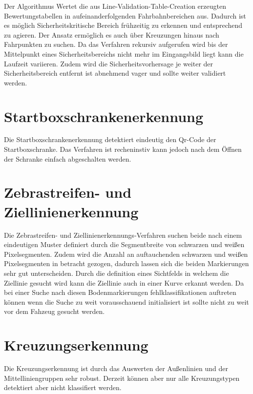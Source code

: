Der Algorithmus Wertet die aus Line-Validation-Table-Creation erzeugten Bewertungstabellen in aufeinanderfolgenden Fahrbahnbereichen aus. Dadurch ist es m{\"o}glich Sicherheitskritische Bereich fr{\"u}hzeitig zu erkennen und entsprechend zu agieren. Der Ansatz erm{\"o}glich es auch {\"u}ber Kreuzungen hinaus nach Fahrpunkten zu suchen. Da das Verfahren rekursiv aufgerufen wird bis der Mittelpunkt eines Sicherheitsbereichs nicht mehr im Eingangsbild liegt kann die Laufzeit variieren. Zudem wird die Sicherheitsvorhersage je weiter der Sicherheitsbereich entfernt ist abnehmend vager und sollte weiter validiert werden.

\section{Startboxschrankenerkennung}
\label{section:Startboxschrankenerkennung}
Die Startboxschrankenerkennung detektiert eindeutig den Qr-Code der Startboxschranke. Das Verfahren ist recheninstiv kann jedoch nach dem {\"O}ffnen der Schranke einfach abgeschalten werden.


\section{Zebrastreifen- und Ziellinienerkennung}
\label{section:Zebrastreifen- und Ziellinienerkennung}
Die Zebrastreifen- und Ziellinienerkennungs-Verfahren suchen beide nach einem eindeutigen Muster definiert durch die Segmentbreite von schwarzen und wei{\ss}en Pixelsegmenten. Zudem wird die Anzahl an auftauchenden schwarzen und wei{\ss}en Pixelsegmenten in betracht gezogen, dadurch lassen sich die beiden Markierungen sehr gut unterscheiden.
Durch die definition eines Sichtfelds in welchem die Ziellinie gesucht wird kann die Ziellinie auch in einer Kurve erkannt werden.
Da bei einer Suche nach diesen Bodenmarkierungen fehlklassifikationen auftreten k{\"o}nnen wenn die Suche zu weit vorausschauend initialisiert ist sollte nicht zu weit vor dem Fahzeug gesucht werden.  


\section{Kreuzungserkennung}
\label{section:Kreuzungserkennung}
Die Kreuzungserkennung ist durch das Auswerten der Au{\ss}enlinien und der Mittelliniengruppen sehr robust. Derzeit k{\"o}nnen aber nur alle Kreuzungstypen detektiert aber nicht klassifiert werden.


